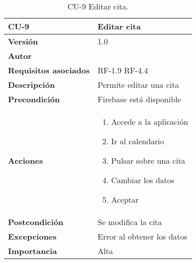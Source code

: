 \begin{table}[p]
	\centering
	\begin{tabularx}{\linewidth}{ p{} p{} }
		\toprule
		\textbf{CU-9}    & \textbf{Editar cita}\\
		\toprule
		\textbf{Versión}              & 1.0    \\
		\textbf{Autor}                & {\nombre} \\
		\textbf{Requisitos asociados} & RF-1.9 RF-4.4 \\
		\textbf{Descripción}          & Permite editar una cita\\
		\textbf{Precondición}         & Firebase está disponible \\
		\textbf{Acciones}             &
		\begin{enumerate}
			\def\labelenumi{\arabic{enumi}.}
			\tightlist
			\item Accede a la aplicación
			\item Ir al calendario
			\item Pulsar sobre una cita
			\item Cambiar los datos
			\item Aceptar
		\end{enumerate}\\
		\textbf{Postcondición}        & Se modifica la cita \\
		\textbf{Excepciones}          & Error al obtener los datos \\
		\textbf{Importancia}          & Alta \\
		\bottomrule
	\end{tabularx}
	\caption{CU-9 Editar cita.}
\end{table}

